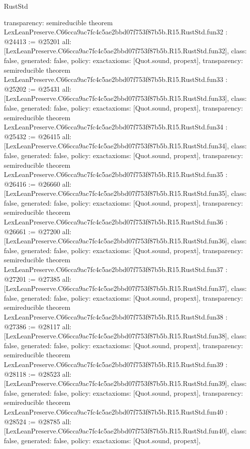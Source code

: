 \begin{lexlean}{RustStd}
\begin{coremodule}
{  transparency: semireducible
}
theorem LexLeanPreserve.C66cca9ac7fc4c5ae2bbd07f753f87b5b.R15.RustStd.fun32 : @24413 := @25201 {
  all: [LexLeanPreserve.C66cca9ac7fc4c5ae2bbd07f753f87b5b.R15.RustStd.fun32],
  class: false,
  generated: false,
  policy: exact{axioms: [Quot.sound, propext]},
  transparency: semireducible
}
theorem LexLeanPreserve.C66cca9ac7fc4c5ae2bbd07f753f87b5b.R15.RustStd.fun33 : @25202 := @25431 {
  all: [LexLeanPreserve.C66cca9ac7fc4c5ae2bbd07f753f87b5b.R15.RustStd.fun33],
  class: false,
  generated: false,
  policy: exact{axioms: [Quot.sound, propext]},
  transparency: semireducible
}
theorem LexLeanPreserve.C66cca9ac7fc4c5ae2bbd07f753f87b5b.R15.RustStd.fun34 : @25432 := @26415 {
  all: [LexLeanPreserve.C66cca9ac7fc4c5ae2bbd07f753f87b5b.R15.RustStd.fun34],
  class: false,
  generated: false,
  policy: exact{axioms: [Quot.sound, propext]},
  transparency: semireducible
}
theorem LexLeanPreserve.C66cca9ac7fc4c5ae2bbd07f753f87b5b.R15.RustStd.fun35 : @26416 := @26660 {
  all: [LexLeanPreserve.C66cca9ac7fc4c5ae2bbd07f753f87b5b.R15.RustStd.fun35],
  class: false,
  generated: false,
  policy: exact{axioms: [Quot.sound, propext]},
  transparency: semireducible
}
theorem LexLeanPreserve.C66cca9ac7fc4c5ae2bbd07f753f87b5b.R15.RustStd.fun36 : @26661 := @27200 {
  all: [LexLeanPreserve.C66cca9ac7fc4c5ae2bbd07f753f87b5b.R15.RustStd.fun36],
  class: false,
  generated: false,
  policy: exact{axioms: [Quot.sound, propext]},
  transparency: semireducible
}
theorem LexLeanPreserve.C66cca9ac7fc4c5ae2bbd07f753f87b5b.R15.RustStd.fun37 : @27201 := @27385 {
  all: [LexLeanPreserve.C66cca9ac7fc4c5ae2bbd07f753f87b5b.R15.RustStd.fun37],
  class: false,
  generated: false,
  policy: exact{axioms: [Quot.sound, propext]},
  transparency: semireducible
}
theorem LexLeanPreserve.C66cca9ac7fc4c5ae2bbd07f753f87b5b.R15.RustStd.fun38 : @27386 := @28117 {
  all: [LexLeanPreserve.C66cca9ac7fc4c5ae2bbd07f753f87b5b.R15.RustStd.fun38],
  class: false,
  generated: false,
  policy: exact{axioms: [Quot.sound, propext]},
  transparency: semireducible
}
theorem LexLeanPreserve.C66cca9ac7fc4c5ae2bbd07f753f87b5b.R15.RustStd.fun39 : @28118 := @28523 {
  all: [LexLeanPreserve.C66cca9ac7fc4c5ae2bbd07f753f87b5b.R15.RustStd.fun39],
  class: false,
  generated: false,
  policy: exact{axioms: [Quot.sound, propext]},
  transparency: semireducible
}
theorem LexLeanPreserve.C66cca9ac7fc4c5ae2bbd07f753f87b5b.R15.RustStd.fun40 : @28524 := @28785 {
  all: [LexLeanPreserve.C66cca9ac7fc4c5ae2bbd07f753f87b5b.R15.RustStd.fun40],
  class: false,
  generated: false,
  policy: exact{axioms: [Quot.sound, propext]},
}
\end{coremodule}
\end{lexlean}
